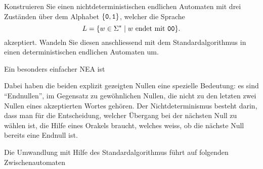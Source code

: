 Konstruieren Sie einen nichtdeterministischen endlichen Automaten
mit drei Zuständen
über dem Alphabet $\{{\tt 0},{\tt 1}\}$, welcher die Sprache
\[
L=\{w\in\Sigma^*\mid \text{$w$ endet mit {\tt 00}}\}.
\]
akzeptiert.
Wandeln Sie diesen anschliessend mit dem Standardalgorithmus
in einen deterministischen endlichen Automaten um.


\begin{loesung}
\def\zustand#1#2{
	\draw #1 circle[radius=0.4];
	\node at #1 {#2};
}
\def\akzeptierzustand#1#2{
	\draw #1 circle[radius=0.34];
	\zustand{#1}{#2}
}
\def\pfeil#1#2{
	\draw[->,shorten >= 0.4cm,shorten <= 0.4cm] #1 -- #2;
}
Ein besonders einfacher NEA ist
\begin{center}
\end{center}
Dabei haben die beiden explizit gezeigten Nullen eine spezielle
Bedeutung: es sind ``Endnullen'', im Gegensatz zu gewöhnlichen
Nullen, die nicht zu den letzten zwei Nullen eines akzeptierten Wortes
gehören.
Der Nichtdeterminismus besteht darin, dass man für die
Entscheidung, welcher Übergang bei der nächsten Null zu wählen
ist, die Hilfe eines Orakels braucht, welches weiss, ob die
nächste Null bereits eine Endnull ist.

Die Umwandlung mit Hilfe des Standardalgorithmus führt auf folgenden
Zwischenautomaten
\begin{center}
\end{center}
\end{loesung}
